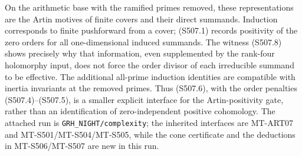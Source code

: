 On the arithmetic base with the ramified primes removed, these
representations are the Artin motives of finite covers and their
direct summands.  Induction corresponds to finite pushforward
from a cover; (S507.1) records positivity of the zero orders
for all one-dimensional induced summands.  The witness (S507.8)
shows precisely why that information, even supplemented by the
rank-four holomorphy input, does not force the order divisor of
each irreducible summand to be effective.  The additional
all-prime induction identities are compatible with inertia
invariants at the removed primes.  Thus (S507.6), with the order
penalties (S507.4)--(S507.5), is a smaller explicit interface for
the Artin-positivity gate, rather than an identification of
zero-independent positive cohomology.  The attached run is
\texttt{GRH\_NIGHT/complexity}; the inherited interfaces are
MT-ART07 and MT-S501/MT-S504/MT-S505, while the cone certificate
and the deductions in MT-S506/MT-S507 are new in this run.
